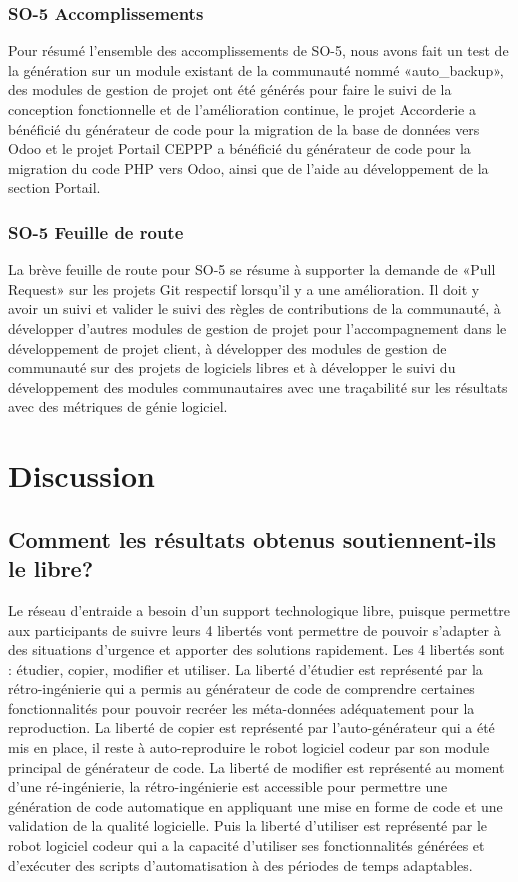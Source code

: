 \subsubsection{SO-5 Accomplissements}
Pour résumé l'ensemble des accomplissements de SO-5, nous avons fait un test de la génération sur un module existant de la communauté nommé «auto\_backup», des modules de gestion de projet ont été générés pour faire le suivi de la conception fonctionnelle et de l’amélioration continue, le projet Accorderie a bénéficié du générateur de code pour la migration de la base de données vers Odoo et le projet Portail CEPPP a bénéficié du générateur de code pour la migration du code PHP vers Odoo, ainsi que de l’aide au développement de la section Portail.

\subsubsection{SO-5 Feuille de route}
La brève feuille de route pour SO-5 se résume à supporter la demande de «Pull Request» sur les projets Git respectif lorsqu’il y a une amélioration. Il doit y avoir un suivi et valider le suivi des règles de contributions de la communauté, à développer d’autres modules de gestion de projet pour l’accompagnement dans le développement de projet client, à développer des modules de gestion de communauté sur des projets de logiciels libres et à développer le suivi du développement des modules communautaires avec une traçabilité sur les résultats avec des métriques de génie logiciel.

\section{Discussion}

\subsection{Comment les résultats obtenus soutiennent-ils le libre?}
Le réseau d’entraide a besoin d’un support technologique libre, puisque permettre aux participants de suivre leurs 4 libertés vont permettre de pouvoir s’adapter à des situations d’urgence et apporter des solutions rapidement. Les 4 libertés sont : étudier, copier, modifier et utiliser. La liberté d'étudier est représenté par la rétro-ingénierie qui a permis au générateur de code de comprendre certaines fonctionnalités pour pouvoir recréer les méta-données adéquatement pour la reproduction. La liberté de copier est représenté par l’auto-générateur qui a été mis en place, il reste à auto-reproduire le robot logiciel codeur par son module principal de générateur de code. La liberté de modifier est représenté au moment d'une ré-ingénierie, la rétro-ingénierie est accessible pour permettre une génération de code automatique en appliquant une mise en forme de code et une validation de la qualité logicielle. Puis la liberté d'utiliser est représenté par le robot logiciel codeur qui a la capacité d’utiliser ses fonctionnalités générées et d’exécuter des scripts d’automatisation à des périodes de temps adaptables.

